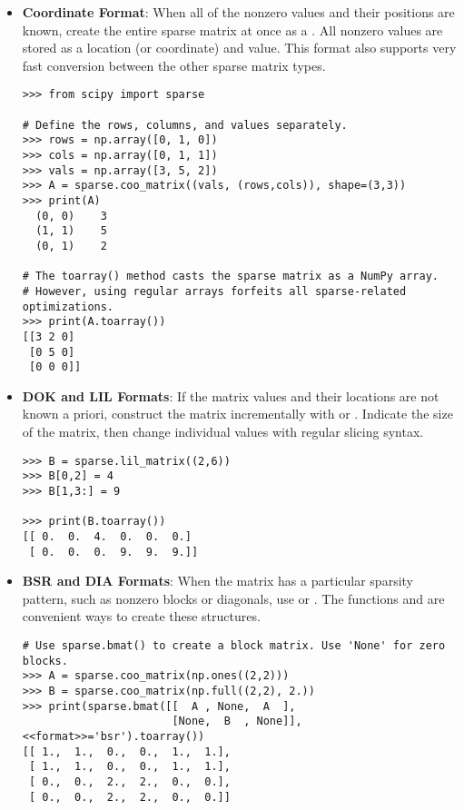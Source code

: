 \begin{itemize} %

\item \textbf{Coordinate Format}:
When all of the nonzero values and their positions are known, create the entire sparse matrix at once as a .
All nonzero values are stored as a location (or coordinate) and value.
This format also supports very fast conversion between the other sparse matrix types.

\begin{lstlisting}
>>> from scipy import sparse

# Define the rows, columns, and values separately.
>>> rows = np.array([0, 1, 0])
>>> cols = np.array([0, 1, 1])
>>> vals = np.array([3, 5, 2])
>>> A = sparse.coo_matrix((vals, (rows,cols)), shape=(3,3))
>>> print(A)
  (0, 0)    3
  (1, 1)    5
  (0, 1)    2

# The toarray() method casts the sparse matrix as a NumPy array.
# However, using regular arrays forfeits all sparse-related optimizations.
>>> print(A.toarray())
[[3 2 0]
 [0 5 0]
 [0 0 0]]
\end{lstlisting}

\item \textbf{DOK and LIL Formats}:
If the matrix values and their locations are not known a priori, construct the matrix incrementally with  or .
Indicate the size of the matrix, then change individual values with regular slicing syntax.

\begin{lstlisting}
>>> B = sparse.lil_matrix((2,6))
>>> B[0,2] = 4
>>> B[1,3:] = 9

>>> print(B.toarray())
[[ 0.  0.  4.  0.  0.  0.]
 [ 0.  0.  0.  9.  9.  9.]]
\end{lstlisting}

\item \textbf{BSR and DIA Formats}:
When the matrix has a particular sparsity pattern, such as nonzero blocks or diagonals, use  or .
The functions  and  are convenient ways to create these structures.

\begin{lstlisting}
# Use sparse.bmat() to create a block matrix. Use 'None' for zero blocks.
>>> A = sparse.coo_matrix(np.ones((2,2)))
>>> B = sparse.coo_matrix(np.full((2,2), 2.))
>>> print(sparse.bmat([[  A , None,  A  ],
                       [None,  B  , None]], <<format>>='bsr').toarray())
[[ 1.,  1.,  0.,  0.,  1.,  1.],
 [ 1.,  1.,  0.,  0.,  1.,  1.],
 [ 0.,  0.,  2.,  2.,  0.,  0.],
 [ 0.,  0.,  2.,  2.,  0.,  0.]]


\end{lstlisting}
\end{itemize}

